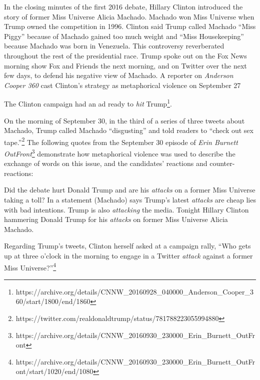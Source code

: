 In the closing minutes of the first 2016 debate, Hillary Clinton introduced the 
story of former Miss Universe
Alicia Machado. Machado won Miss Universe when Trump owned the competition
in 1996. Clinton said Trump called Machado ``Miss Piggy'' because
of Machado gained too much weight and ``Miss Housekeeping'' 
because Machado was born in Venezuela. 
This controversy reverberated throughout the rest of the presidential race.
Trump spoke out on the Fox News morning show Fox and Friends the 
next morning, and on Twitter over the 
next few days, to defend his negative view of Machado. A reporter on 
\emph{Anderson Cooper 360} cast Clinton's strategy as metaphorical violence 
on September 27
\begin{exe}
  \ex The Clinton campaign had an ad ready to \emph{hit} Trump\footnote{\tiny https://archive.org/details/CNNW\_20160928\_040000\_Anderson\_Cooper\_360/start/1800/end/1860}.
\end{exe}
On the morning of September 30, in the third of
a series of three tweets about Machado, Trump called 
Machado ``disgusting'' and told readers to ``check out sex tape.''\footnote{\tiny https://twitter.com/realdonaldtrump/status/781788223055994880} 
The following quotes from the September 30 episode
of \emph{Erin Burnett OutFront}\footnote{\tiny https://archive.org/details/CNNW\_20160930\_230000\_Erin\_Burnett\_OutFront} 
demonstrate how metaphorical violence was used
to describe the exchange of words on this issue, and the candidates' 
reactions and counter-reactions:

\begin{exe}
  \ex Did the debate hurt Donald Trump and are his \emph{attacks} on a former
    Miss Universe taking a toll?
  \ex In a statement (Machado) says Trump's latest \emph{attacks} are cheap lies 
    with bad intentions.
  \ex Trump is also \emph{attacking} the media.
  \ex Tonight Hillary Clinton hammering Donald Trump for his \emph{attacks} on 
    former Miss Universe Alicia Machado.
\end{exe}
Regarding Trump's tweets, Clinton herself asked at a campaign rally, ``Who
gets up at three o'clock in the morning to engage in a Twitter \emph{attack} against
a former Miss Universe?''\footnote{\tiny https://archive.org/details/CNNW\_20160930\_230000\_Erin\_Burnett\_OutFront/start/1020/end/1080} 


